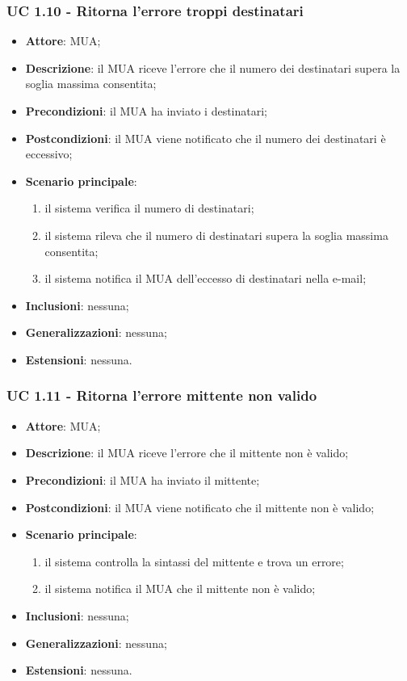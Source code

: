    \subsubsection{UC 1.10 - Ritorna l'errore troppi destinatari} \label{sec:UC1.10}
    \begin{itemize}
        \item \textbf{Attore}: MUA;
        \item \textbf{Descrizione}: il MUA riceve l'errore che il numero dei destinatari supera la soglia massima consentita;
        \item \textbf{Precondizioni}: il MUA ha inviato i destinatari;
        \item \textbf{Postcondizioni}: il MUA viene notificato che il numero dei destinatari è eccessivo;
        \item \textbf{Scenario principale}:
            \begin{enumerate}
                \item il sistema verifica il numero di destinatari;
                \item il sistema rileva che il numero di destinatari supera la soglia massima consentita;
                \item il sistema notifica il MUA dell'eccesso di destinatari nella e-mail;
            \end{enumerate}
        \item \textbf{Inclusioni}: nessuna;
        \item \textbf{Generalizzazioni}: nessuna;
        \item \textbf{Estensioni}: nessuna.
    \end{itemize}


    \subsubsection{UC 1.11 - Ritorna l'errore mittente non valido} \label{sec:UC1.11}
    \begin{itemize}
        \item \textbf{Attore}: MUA;
        \item \textbf{Descrizione}: il MUA riceve l'errore che il mittente non è valido;
        \item \textbf{Precondizioni}: il MUA ha inviato il mittente;
        \item \textbf{Postcondizioni}: il MUA viene notificato che il mittente non è valido;
        \item \textbf{Scenario principale}:
            \begin{enumerate}
                \item il sistema controlla la sintassi del mittente e trova un errore;
                \item il sistema notifica il MUA che il mittente non è valido;
            \end{enumerate}
        \item \textbf{Inclusioni}: nessuna;
        \item \textbf{Generalizzazioni}: nessuna;
        \item \textbf{Estensioni}: nessuna.
    \end{itemize}



